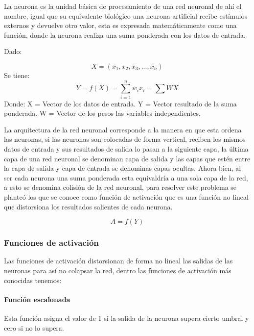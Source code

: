 \documentclass[
  12pt,
]{article}
\begin{document}
La neurona es la unidad básica de procesamiento de una red neuronal de
ahí el nombre, igual que su equivalente biológico una neurona artificial
recibe estímulos externos y devuelve otro valor, esta es expresada
matemáticamente como una función, donde la neurona realiza una suma
ponderada con los datos de entrada.

Dado:

\[ X = \left( x_{1},x_{2},x_{3},...,x_{n} \right) \] Se tiene:
\[ Y = f(X) = \sum_{i=1}^{n}{w_{i}x_{i}}  = \sum{WX}  \] Donde: \newline
X = Vector de los datos de entrada. \newline Y = Vector resultado de la
suma ponderada. \newline W = Vector de los pesos las variables
independientes.

La arquitectura de la red neuronal corresponde a la manera en que esta
ordena las neuronas, si las neuronas son colocadas de forma vertical,
reciben los mismos datos de entrada y sus resultados de salida lo pasan
a la siguiente capa, la última capa de una red neuronal se denominan
capa de salida y las capas que estén entre la capa de salida y capa de
entrada se denominas capas ocultas. Ahora bien, al ser cada neurona una
suma ponderada esta equivaldría a una sola capa de la red, a esto se
denomina colisión de la red neuronal, para resolver este problema se
planteó los que se conoce como función de activación que es una función
no lineal que distorsiona los resultados salientes de cada neurona.

\[A = f(Y)\]

\hypertarget{funciones-de-activaciuxf3n}{%
\subsubsection{Funciones de
activación}\label{funciones-de-activaciuxf3n}}

Las funciones de activación distorsionan de forma no lineal las salidas
de las neuronas para así no colapsar la red, dentro las funciones de
activación más conocidas tenemos:

\hypertarget{funciuxf3n-escalonada}{%
\paragraph{Función escalonada}\label{funciuxf3n-escalonada}}

Esta función asigna el valor de 1 si la salida de la neurona supera
cierto umbral y cero si no lo supera.
\end{document}
